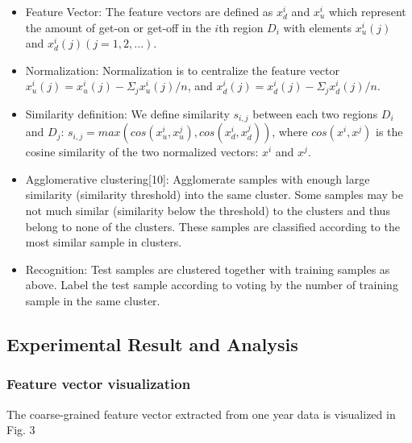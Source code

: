 \documentclass[a4paper, 10pt, conference]{ieeeconf}      %
\begin{document}
\begin{itemize}

\item Feature Vector: The feature vectors are defined as $ x^{i}_{d} $ and $ x^{i}_{u} $ which represent the amount of get-on or get-off in the $i$th region $D_i$ with elements $ x^{i}_{u}(j) $ and $ x^{i}_{d}(j) (j=1,2,...) $.
\item Normalization: Normalization is to centralize the feature vector $ x^{i}_{u}(j)=x^{i}_{u}(j)-\Sigma_{j}x^{i}_{u}(j)/n $, and $ x^{i}_{d}(j)=x^{i}_{d}(j)-\Sigma_{j}x^{i}_{d}(j)/n $.
\item Similarity definition: We define similarity $ s_{i,j} $ between each two regions $ D_i $ and $ D_j $: $ s_{i,j}=max(cos(x^{i}_{u},x^{j}_{u}),cos(x^{i}_{d},x^{j}_{d})) $, where $ cos(x^i,x^j) $ is the cosine similarity of the two normalized vectors: $ x^i $ and $ x^j $.
\item Agglomerative clustering[10]: Agglomerate samples with enough large similarity (similarity threshold) into the same cluster. Some samples may be not much similar (similarity below the threshold) to the clusters and thus belong to none of the clusters. These samples are classified according to the most similar sample in clusters.
\item Recognition: Test samples are clustered together with training samples as above. Label the test sample according to voting by the number of training sample in the same cluster.

\end{itemize}

\subsection{Experimental Result and Analysis}

\subsubsection{Feature vector visualization}The coarse-grained feature vector extracted from one year data is visualized in Fig. 3
\end{document}
